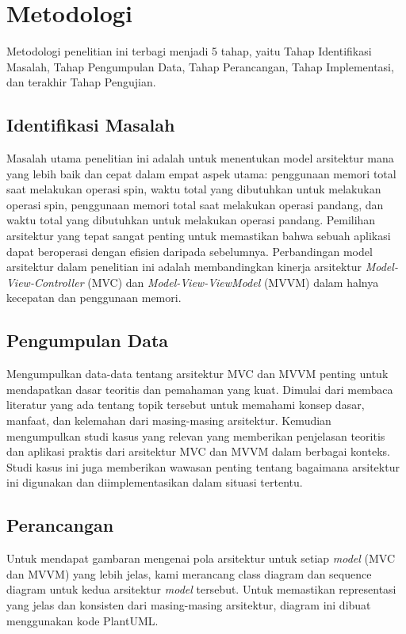 \documentclass[conference]{IEEEtran}
\begin{document}
	\section{Metodologi}
	Metodologi penelitian ini terbagi menjadi 5 tahap, yaitu Tahap Identifikasi Masalah, Tahap Pengumpulan Data, Tahap Perancangan, Tahap Implementasi, dan terakhir Tahap Pengujian.
	\subsection{Identifikasi Masalah}
	Masalah utama penelitian ini adalah untuk menentukan model arsitektur mana yang lebih baik dan cepat dalam empat aspek utama: penggunaan memori total saat melakukan operasi spin, waktu total yang dibutuhkan untuk melakukan operasi spin, penggunaan memori total saat melakukan operasi pandang, dan waktu total yang dibutuhkan untuk melakukan operasi pandang. Pemilihan arsitektur yang tepat sangat penting untuk memastikan bahwa sebuah aplikasi dapat beroperasi dengan efisien daripada sebelumnya. Perbandingan model arsitektur dalam penelitian ini adalah membandingkan kinerja arsitektur \textit{Model-View-Controller} (MVC) dan \textit{Model-View-ViewModel} (MVVM) dalam halnya kecepatan dan penggunaan memori.
	
	\subsection{Pengumpulan Data}
	Mengumpulkan data-data tentang arsitektur MVC dan MVVM penting untuk mendapatkan dasar teoritis dan pemahaman yang kuat. Dimulai dari membaca literatur yang ada tentang topik tersebut untuk memahami konsep dasar, manfaat, dan kelemahan dari masing-masing arsitektur. Kemudian mengumpulkan studi kasus yang relevan yang memberikan penjelasan teoritis dan aplikasi praktis dari arsitektur MVC dan MVVM dalam berbagai konteks. Studi kasus ini juga memberikan wawasan penting tentang bagaimana arsitektur ini digunakan dan diimplementasikan dalam situasi tertentu.
	
	\subsection{Perancangan}
	Untuk mendapat gambaran mengenai pola arsitektur untuk setiap \textit{model} (MVC dan MVVM) yang lebih jelas, kami merancang class diagram dan sequence diagram untuk kedua arsitektur \textit{model} tersebut. Untuk memastikan representasi yang jelas dan konsisten dari masing-masing arsitektur, diagram ini dibuat menggunakan kode PlantUML. 
	
\end{document}

